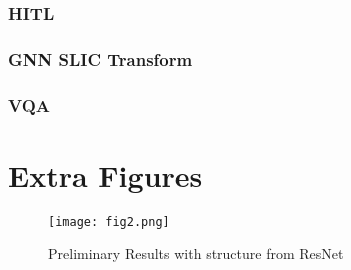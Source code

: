 \documentclass{article}
\begin{document}
\subsubsection{HITL}

\subsubsection{GNN SLIC Transform}


\subsubsection{VQA}


\newpage 
\appendix

\section{Extra Figures}

\begin{figure}[H]
    \centering
    \texttt{[image: fig2.png]}
    \caption{Preliminary Results with structure from ResNet}
    \label{fig:prelim_results_2}
\end{figure}

\medskip


\small




\end{document}
